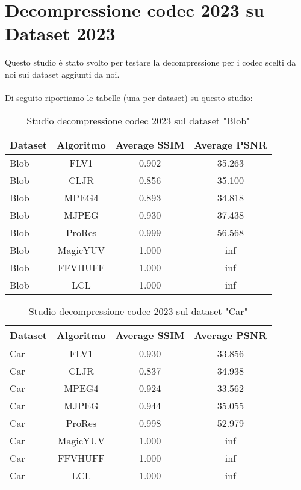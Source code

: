 \clearpage

\clearpage
\section{Decompressione codec 2023 su Dataset 2023}
Questo studio è stato svolto per testare la decompressione per i codec scelti da noi sui dataset aggiunti da noi.
\\
\\
Di seguito riportiamo le tabelle (una per dataset) su questo studio:
    
\begin{table}[ht]
\centering
\begin{tabular}{|l|c|c|c|}
\hline
Dataset               & Algoritmo & Average SSIM & Average PSNR
\\ \hline
Blob                  & FLV1      & 0.902        & 35.263       \\ \hline
Blob                  & CLJR      & 0.856        & 35.100       \\ \hline
Blob                  & MPEG4     & 0.893        & 34.818       \\ \hline
Blob                  & MJPEG     & 0.930        & 37.438       \\ \hline
Blob                  & ProRes    & 0.999        & 56.568       \\ \hline
Blob                  & MagicYUV  & 1.000        & inf          \\ \hline
Blob                  & FFVHUFF   & 1.000        & inf          \\ \hline
Blob                  & LCL       & 1.000        & inf          \\ \hline
\end{tabular}
\caption{Studio decompressione codec 2023 sul dataset  "Blob"}
\end{table}

\begin{table}[ht]
\centering
\begin{tabular}{|l|c|c|c|}
\hline
Dataset               & Algoritmo & Average SSIM & Average PSNR
\\ \hline
Car                   & FLV1      & 0.930        & 33.856       \\ \hline
Car                   & CLJR      & 0.837        & 34.938       \\ \hline
Car                   & MPEG4     & 0.924        & 33.562       \\ \hline
Car                   & MJPEG     & 0.944        & 35.055       \\ \hline
Car                   & ProRes    & 0.998        & 52.979       \\ \hline
Car                   & MagicYUV  & 1.000        & inf          \\ \hline
Car                   & FFVHUFF   & 1.000        & inf          \\ \hline
Car                   & LCL       & 1.000        & inf          \\ \hline
\end{tabular}
\caption{Studio decompressione codec 2023 sul dataset  "Car"}
\end{table}

